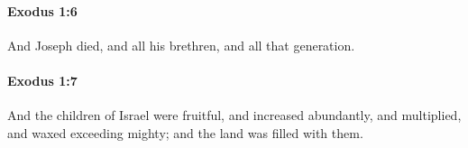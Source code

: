		\paragraph{Exodus 1:6} %
			\label{EXODUS-1-6}

			And Joseph died, and all his brethren, and all that generation.


		\paragraph{Exodus 1:7} %
			\label{EXODUS-1-7}

			And the children of Israel were fruitful, and increased abundantly, and multiplied, and waxed exceeding mighty; and the land was filled with them.


